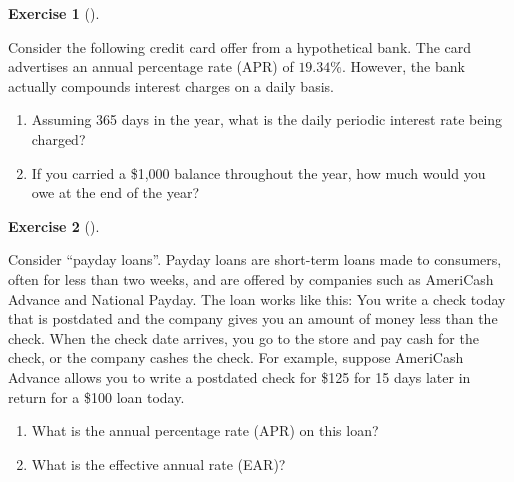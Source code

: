 \documentclass[
  letterpaper,
  DIV=11,
  numbers=noendperiod]{scrreprt}
\providecommand{\tightlist}{%
  \setlength{\itemsep}{0pt}\setlength{\parskip}{0pt}}\usepackage{longtable,booktabs,array}
\theoremstyle{definition}
\newtheorem{exercise}{Exercise}[chapter]
\theoremstyle{definition}
\theoremstyle{remark}
\begin{document}
\begin{exercise}[]\protect\hypertarget{exr-exercise0102}{}\label{exr-exercise0102}

Consider the following credit card offer from a hypothetical bank. The
card advertises an annual percentage rate (APR) of \(19.34\%\). However,
the bank actually compounds interest charges on a daily basis.

\begin{enumerate}
\def\labelenumi{\arabic{enumi}.}
\tightlist
\item
  Assuming 365 days in the year, what is the daily periodic interest
  rate being charged?
\item
  If you carried a \$1,000 balance throughout the year, how much would
  you owe at the end of the year?
\end{enumerate}

\end{exercise}

\begin{exercise}[]\protect\hypertarget{exr-exercise0103}{}\label{exr-exercise0103}

Consider ``payday loans''. Payday loans are short-term loans made to
consumers, often for less than two weeks, and are offered by companies
such as AmeriCash Advance and National Payday. The loan works like this:
You write a check today that is postdated and the company gives you an
amount of money less than the check. When the check date arrives, you go
to the store and pay cash for the check, or the company cashes the
check. For example, suppose AmeriCash Advance allows you to write a
postdated check for \$125 for 15 days later in return for a \$100 loan
today.

\begin{enumerate}
\def\labelenumi{\arabic{enumi}.}
\tightlist
\item
  What is the annual percentage rate (APR) on this loan?
\item
  What is the effective annual rate (EAR)?
\end{enumerate}

\end{exercise}
\end{document}
